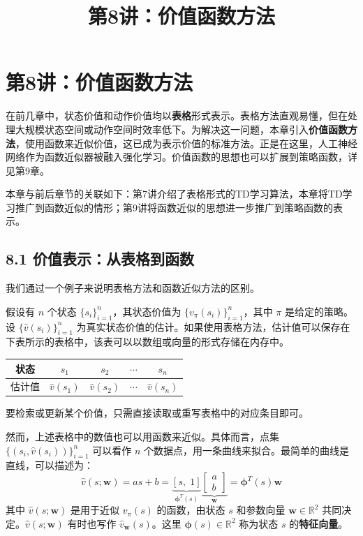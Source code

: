 \documentclass[UTF8]{article}
\title{第8讲：价值函数方法}
\author{}
\date{}
\begin{document}
\maketitle
\thispagestyle{empty}

\section*{第8讲：价值函数方法}

在前几章中，状态价值和动作价值均以\textbf{表格}形式表示。表格方法直观易懂，但在处理大规模状态空间或动作空间时效率低下。为解决这一问题，本章引入\textbf{价值函数方法}，使用函数来近似价值，这已成为表示价值的标准方法。正是在这里，人工神经网络作为函数近似器被融入强化学习。价值函数的思想也可以扩展到策略函数，详见第9章。

本章与前后章节的关联如下：第7讲介绍了表格形式的TD学习算法，本章将TD学习推广到函数近似的情形；第9讲将函数近似的思想进一步推广到策略函数的表示。

\subsection*{8.1 价值表示：从表格到函数}

我们通过一个例子来说明表格方法和函数近似方法的区别。

假设有 $n$ 个状态 $\{s_i\}_{i=1}^{n}$，其状态价值为 $\{v_\pi(s_i)\}_{i=1}^{n}$，其中 $\pi$ 是给定的策略。设 $\{\hat{v}(s_i)\}_{i=1}^{n}$ 为真实状态价值的估计。如果使用表格方法，估计值可以保存在下表所示的表格中，该表可以以数组或向量的形式存储在内存中。

\begin{center}
\begin{tabular}{c|cccc}
状态 & $s_1$ & $s_2$ & $\cdots$ & $s_n$ \\ \hline
估计值 & $\hat{v}(s_1)$ & $\hat{v}(s_2)$ & $\cdots$ & $\hat{v}(s_n)$
\end{tabular}
\end{center}

要检索或更新某个价值，只需直接读取或重写表格中的对应条目即可。

然而，上述表格中的数值也可以用函数来近似。具体而言，点集 $\{(s_i, \hat{v}(s_i))\}_{i=1}^{n}$ 可以看作 $n$ 个数据点，用一条曲线来拟合。最简单的曲线是直线，可以描述为：
\[
\hat{v}(s; \boldsymbol{w}) = a s + b = \underbrace{[s, \; 1]}_{\boldsymbol{\phi}^T(s)} \underbrace{\begin{bmatrix} a \\ b \end{bmatrix}}_{\boldsymbol{w}} = \boldsymbol{\phi}^T(s) \boldsymbol{w}
\tag{8.1}
\]
其中 $\hat{v}(s; \boldsymbol{w})$ 是用于近似 $v_\pi(s)$ 的函数，由状态 $s$ 和参数向量 $\boldsymbol{w} \in \mathbb{R}^2$ 共同决定。$\hat{v}(s; \boldsymbol{w})$ 有时也写作 $\hat{v}_{\boldsymbol{w}}(s)$。这里 $\boldsymbol{\phi}(s) \in \mathbb{R}^2$ 称为状态 $s$ 的\textbf{特征向量}。
\end{document}
